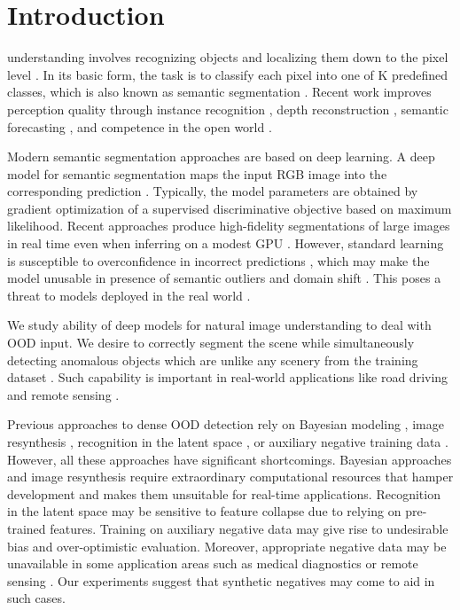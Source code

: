 \documentclass[lettersize,journal,hidelinks]{IEEEtran}
\begin{document}
\section{Introduction}
 understanding involves recognizing objects 
and localizing them down to the pixel level 
\cite{everingham10ijcv}.
In its basic form, 
the task is to classify each pixel 
into one of K predefined classes,
which is also known as
semantic segmentation \cite{farabet13pami}.
Recent work improves perception quality
through instance recognition \cite{cheng20cvpr},
depth reconstruction \cite{godard19iccv},
semantic forecasting \cite{luc18eccv}, 
and competence in the open world \cite{uhlemeyer22uai}.

Modern semantic segmentation approaches \cite{farabet13pami} are based on deep learning.
A deep model for semantic segmentation maps the input RGB image  into the corresponding prediction .
Typically, the model parameters  are obtained by gradient optimization of a supervised discriminative objective based on maximum likelihood.
Recent approaches produce high-fidelity segmentations of large images in real time even when inferring on a modest GPU \cite{orsic21pr}.
However, standard learning is susceptible to overconfidence in incorrect predictions \cite{guo17icml}, 
which may make the model unusable
in presence of semantic outliers \cite{zendel18eccv} and domain shift \cite{sakaridis21iccv}.
This poses a threat to models 
deployed in the real world \cite{chan21arxiv,blum21ijcv}.


We study ability of deep models for natural image understanding to deal with OOD input.
We desire to correctly segment the scene while simultaneously detecting anomalous objects which are unlike any scenery from the training dataset \cite{bevandic22ivc}.
Such capability is important in real-world applications like road driving \cite{lis19iccv,vojir21iccv} and remote sensing \cite{carvalho22rs,dasilva20arxiv}.

Previous approaches to dense OOD detection rely on Bayesian modeling \cite{kendall17nips}, image resynthesis \cite{biase21cvpr,lis19iccv,lis20arxiv}, recognition in the latent space \cite{blum21ijcv}, or
auxiliary negative training data \cite{bevandic19gcpr}. 
However, all these approaches have significant shortcomings.
Bayesian approaches and image resynthesis
require extraordinary computational resources
that hamper development and makes them 
unsuitable for real-time applications.
Recognition in the latent space \cite{blum21ijcv} may be sensitive to feature collapse \cite{amersfoort21arxiv,perera20cvpr}
due to relying on pre-trained features.
Training on auxiliary negative data may give rise to undesirable bias and over-optimistic evaluation.
Moreover, appropriate negative data may be unavailable in some application areas such as medical diagnostics \cite{gonzalez22mia} or remote sensing \cite{carvalho22rs,gawlikowski21igrass}.
Our experiments suggest that synthetic negatives may come to aid in such cases.
\end{document}
